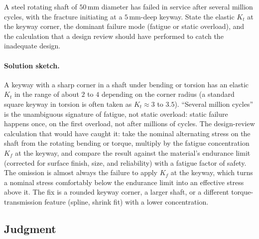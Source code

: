 \begin{exercise}
A steel rotating shaft of $50\,\si{\milli\meter}$ diameter has failed
in service after several million cycles, with the fracture initiating
at a $5\,\si{\milli\meter}$-deep keyway. State the elastic $K_t$ at
the keyway corner, the dominant failure mode (fatigue or static
overload), and the calculation that a design review should have
performed to catch the inadequate design.
\paragraph{Solution sketch.} A keyway with a sharp corner in a shaft
under bending or torsion has an elastic $K_t$ in the range of about
$2$ to $4$ depending on the corner radius (a standard square keyway in
torsion is often taken as $K_t \approx 3$ to $3.5$). ``Several million
cycles'' is the unambiguous signature of fatigue, not static overload:
static failure happens once, on the first overload, not after millions
of cycles. The design-review calculation that would have caught it: take
the nominal alternating stress on the shaft from the rotating bending or
torque, multiply by the fatigue concentration $K_f$ at the keyway, and
compare the result against the material's endurance limit (corrected for
surface finish, size, and reliability) with a fatigue factor of safety.
The omission is almost always the failure to apply $K_f$ at the keyway,
which turns a nominal stress comfortably below the endurance limit into
an effective stress above it. The fix is a rounded keyway corner, a
larger shaft, or a different torque-transmission feature (spline,
shrink fit) with a lower concentration.
\end{exercise}

\subsection*{Judgment}

